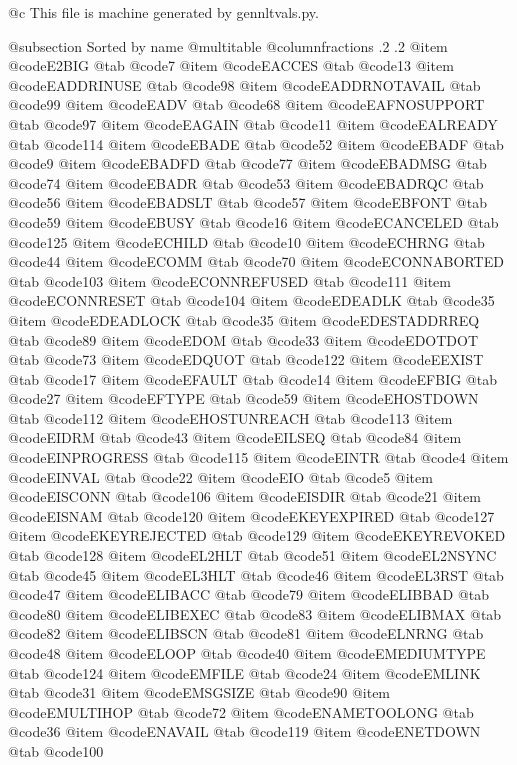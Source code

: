 @c This file is machine generated by gennltvals.py.

@subsection Sorted by name
@multitable @columnfractions .2 .2
@item @code{E2BIG}
@tab @code{7}
@item @code{EACCES}
@tab @code{13}
@item @code{EADDRINUSE}
@tab @code{98}
@item @code{EADDRNOTAVAIL}
@tab @code{99}
@item @code{EADV}
@tab @code{68}
@item @code{EAFNOSUPPORT}
@tab @code{97}
@item @code{EAGAIN}
@tab @code{11}
@item @code{EALREADY}
@tab @code{114}
@item @code{EBADE}
@tab @code{52}
@item @code{EBADF}
@tab @code{9}
@item @code{EBADFD}
@tab @code{77}
@item @code{EBADMSG}
@tab @code{74}
@item @code{EBADR}
@tab @code{53}
@item @code{EBADRQC}
@tab @code{56}
@item @code{EBADSLT}
@tab @code{57}
@item @code{EBFONT}
@tab @code{59}
@item @code{EBUSY}
@tab @code{16}
@item @code{ECANCELED}
@tab @code{125}
@item @code{ECHILD}
@tab @code{10}
@item @code{ECHRNG}
@tab @code{44}
@item @code{ECOMM}
@tab @code{70}
@item @code{ECONNABORTED}
@tab @code{103}
@item @code{ECONNREFUSED}
@tab @code{111}
@item @code{ECONNRESET}
@tab @code{104}
@item @code{EDEADLK}
@tab @code{35}
@item @code{EDEADLOCK}
@tab @code{35}
@item @code{EDESTADDRREQ}
@tab @code{89}
@item @code{EDOM}
@tab @code{33}
@item @code{EDOTDOT}
@tab @code{73}
@item @code{EDQUOT}
@tab @code{122}
@item @code{EEXIST}
@tab @code{17}
@item @code{EFAULT}
@tab @code{14}
@item @code{EFBIG}
@tab @code{27}
@item @code{EFTYPE}
@tab @code{59}
@item @code{EHOSTDOWN}
@tab @code{112}
@item @code{EHOSTUNREACH}
@tab @code{113}
@item @code{EIDRM}
@tab @code{43}
@item @code{EILSEQ}
@tab @code{84}
@item @code{EINPROGRESS}
@tab @code{115}
@item @code{EINTR}
@tab @code{4}
@item @code{EINVAL}
@tab @code{22}
@item @code{EIO}
@tab @code{5}
@item @code{EISCONN}
@tab @code{106}
@item @code{EISDIR}
@tab @code{21}
@item @code{EISNAM}
@tab @code{120}
@item @code{EKEYEXPIRED}
@tab @code{127}
@item @code{EKEYREJECTED}
@tab @code{129}
@item @code{EKEYREVOKED}
@tab @code{128}
@item @code{EL2HLT}
@tab @code{51}
@item @code{EL2NSYNC}
@tab @code{45}
@item @code{EL3HLT}
@tab @code{46}
@item @code{EL3RST}
@tab @code{47}
@item @code{ELIBACC}
@tab @code{79}
@item @code{ELIBBAD}
@tab @code{80}
@item @code{ELIBEXEC}
@tab @code{83}
@item @code{ELIBMAX}
@tab @code{82}
@item @code{ELIBSCN}
@tab @code{81}
@item @code{ELNRNG}
@tab @code{48}
@item @code{ELOOP}
@tab @code{40}
@item @code{EMEDIUMTYPE}
@tab @code{124}
@item @code{EMFILE}
@tab @code{24}
@item @code{EMLINK}
@tab @code{31}
@item @code{EMSGSIZE}
@tab @code{90}
@item @code{EMULTIHOP}
@tab @code{72}
@item @code{ENAMETOOLONG}
@tab @code{36}
@item @code{ENAVAIL}
@tab @code{119}
@item @code{ENETDOWN}
@tab @code{100}
